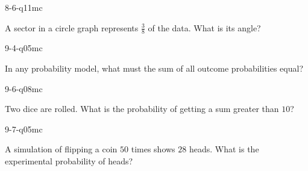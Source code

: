 \begin{practiceQuestion}{8-6-q11}{mc}
\begin{questionText}
A sector in a circle graph represents $\frac{3}{8}$ of the data. What is its angle?
\end{questionText}
\end{practiceQuestion}

\begin{practiceQuestion}{9-4-q05}{mc}
\begin{questionText}
In any probability model, what must the sum of all outcome probabilities equal?
\end{questionText}
\end{practiceQuestion}

\begin{practiceQuestion}{9-6-q08}{mc}
\begin{questionText}
Two dice are rolled. What is the probability of getting a sum greater than $10$?
\end{questionText}
\end{practiceQuestion}

\begin{practiceQuestion}{9-7-q05}{mc}
\begin{questionText}
A simulation of flipping a coin $50$ times shows $28$ heads. What is the experimental probability of heads?
\end{questionText}
\end{practiceQuestion}
